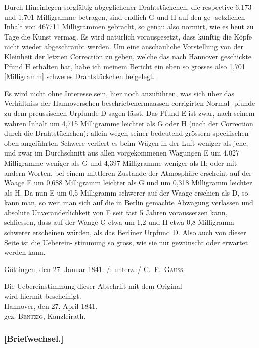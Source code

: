 \documentclass[12pt,a4paper]{article}
\theoremstyle{plain}
\theoremstyle{definition}
\theoremstyle{remark}
\begin{document}
Durch Hineinlegen sorgf\"altig abgeglichener Drahtst\"uckchen, die respective
6,173 und 1,701 Milligramme betragen, sind endlich G und H auf den ge-
setzlichen Inhalt von 467711 Milligrammen gebracht, so genau also normirt,
wie es heut zu Tage die Kunst vermag. Es wird nat\"urlich vorausgesetzt, dass
k\"unftig die K\"opfe nicht wieder abgeschraubt werden. Um eine anschauliche
Vorstellung von der Kleinheit der letzten Correction zu geben, welche das
nach Hannover geschickte Pfund H erhalten hat, habe ich meinem Bericht
ein eben so grosses also 1,701 [Milligramm] schweres Drahtst\"uckchen beigelegt.

Es wird nicht ohne Interesse sein, hier noch anzuf\"uhren, was sich \"uber
das Verh\"altniss der Hannoverschen beschriebenermaassen corrigirten Normal-
pfunde zu dem preussischen Urpfunde D sagen l\"asst. Das Pfund E ist zwar,
nach seinem wahren Inhalt um 4,715 Milligramme leichter als G oder H
(nach der Correction durch die Drahtst\"uckchen): allein wegen seiner bedeutend
gr\"ossern specifischen oben angef\"uhrten Schwere verliert es beim W\"agen in der
Luft weniger als jene, und zwar im Durchschnitt aus allen vorgekommenen
Wagungen E um 4,027 Milligramme weniger als G und 4,397 Milligramme
weniger als H; oder mit andern Worten, bei einem mittleren Zustande der
Atmosph\"are erscheint auf der Waage E um 0,688 Milligramm leichter als
G und um 0,318 Milligramm leichter als H. Da nun E um 0,5 Milligramm
schwerer auf der Waage erschien als D, so kann man, so weit man sich auf
die in Berlin gemachte Abw\"agung verlassen und absolute Unver\"anderlichkeit
von E seit fast 5 Jahren voraussetzen kann, schliessen, dass auf der Waage
G etwa um 1,2 und H etwa 0,8 Milligramm schwerer erscheinen w\"urden,
als das Berliner Urpfund D. Also auch von dieser Seite ist die Ueberein-
stimmung so gross, wie sie nur gew\"unscht oder erwartet werden kann.

\begin{flushright}
G\"ottingen, den 27. Januar 1841. /: unterz.:/ \textsc{C.~F.~Gauss.}
\end{flushright}

\vspace{0.3cm}
\noindent Die Uebereinstimmung dieser Abschrift mit dem Original\\
wird hiermit bescheinigt.\\
Hannover, den 27. April 1841.\\
gez. \textsc{Bentzig}, Kanzleirath.

\newpage


\subsubsection*{[Briefwechsel.]}
\end{document}
